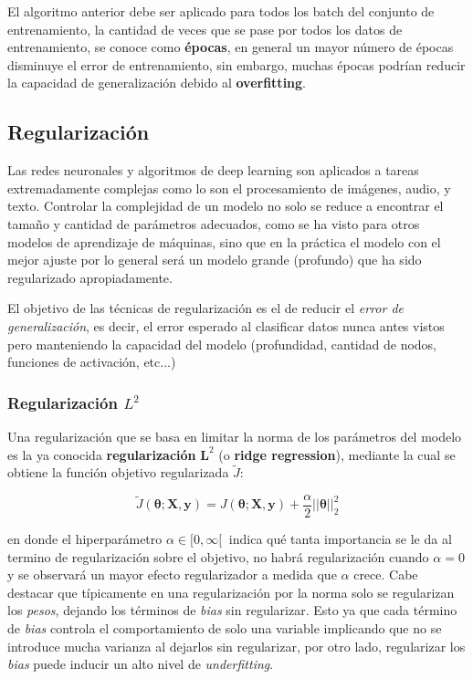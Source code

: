 \begin{remark}
	El algoritmo anterior debe ser aplicado para todos los batch del conjunto de entrenamiento, la cantidad de veces que se pase por todos los datos de entrenamiento, se conoce como \textbf{épocas}, en general un mayor número de épocas disminuye el error de entrenamiento, sin embargo, muchas épocas podrían reducir la capacidad de generalización debido al \textbf{overfitting}.	
\end{remark}

\subsection{Regularización}

Las redes neuronales y algoritmos de deep learning son aplicados a tareas extremadamente complejas como lo son el procesamiento de im\'agenes, audio, y texto. Controlar la complejidad de un modelo no solo se reduce a encontrar el tamaño y cantidad de parámetros adecuados, como se ha visto para otros modelos de aprendizaje de m\'aquinas, sino que en la pr\'actica el modelo con el mejor ajuste por lo general ser\'a un modelo grande (profundo) que ha sido regularizado apropiadamente. 

El objetivo de las técnicas de regularización es el de reducir el \textit{error de generalización}, es decir, el error esperado al clasificar datos nunca antes vistos pero manteniendo la capacidad del modelo (profundidad, cantidad de nodos, funciones de activación, etc...)

\subsubsection{Regularización ${L}^{2}$}

Una regularizaci\'on que se basa en limitar la norma de los parámetros del modelo es la ya conocida \textbf{regularizaci\'on} $\bm{L}^{2}$ (o \textbf{ridge regression}), mediante la cual se obtiene la funci\'on objetivo regularizada $\tilde{J}$:

\begin{equation}
\tilde{J}(\bm{\theta};\bm{X},\bm{y}) = J(\bm{\theta};\bm{X},\bm{y}) + \frac{\alpha}{2}||\bm{\theta}||^{2}_{2}
\end{equation}

en donde el hiperpar\'ametro $\alpha \in [0,\infty[\ $ indica qué tanta importancia se le da al termino de regularización sobre el objetivo, no habrá regularizaci\'on cuando $\alpha = 0$ y se observará un mayor efecto regularizador a medida que $\alpha$ crece. Cabe destacar que t\'ipicamente en una regularizaci\'on por la norma solo se regularizan los \textit{pesos}, dejando los t\'erminos de \textit{bias} sin regularizar. Esto ya que cada t\'ermino de \textit{bias} controla el comportamiento de solo una variable implicando que no se introduce mucha varianza al dejarlos sin regularizar, por otro lado, regularizar los \textit{bias} puede inducir un alto nivel de \textit{underfitting}.

